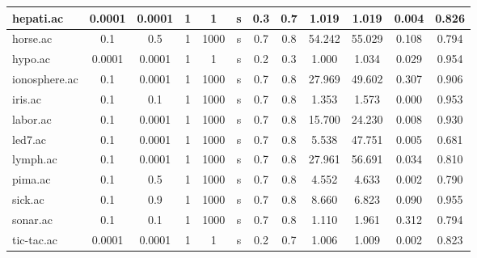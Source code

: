 \begin{table}[htbp]
\begin{tabular}{|l|c|c|c|c|c|c|c||c|c|c|c|}
		\hline
		hepati.ac      & 0.0001   & 0.0001      & 1              & 1                   & s        & 0.3    & 0.7   & 1.019          & 1.019          & 0.004          & 0.826          \\
		\hline
		horse.ac       & 0.1      & 0.5         & 1              & 1000                & s        & 0.7    & 0.8   & 54.242         & 55.029         & 0.108          & 0.794          \\
		\hline
		hypo.ac        & 0.0001   & 0.0001      & 1              & 1                   & s        & 0.2    & 0.3   & 1.000          & 1.034          & 0.029          & 0.954          \\
		\hline
		ionosphere.ac  & 0.1      & 0.0001      & 1              & 1000                & s        & 0.7    & 0.8   & 27.969         & 49.602         & 0.307          & 0.906          \\
		\hline
		iris.ac        & 0.1      & 0.1         & 1              & 1000                & s        & 0.7    & 0.8   & 1.353          & 1.573          & 0.000          & 0.953          \\
		\hline
		labor.ac       & 0.1      & 0.0001      & 1              & 1000                & s        & 0.7    & 0.8   & 15.700         & 24.230         & 0.008          & 0.930          \\
		\hline
		led7.ac        & 0.1      & 0.0001      & 1              & 1000                & s        & 0.7    & 0.8   & 5.538          & 47.751         & 0.005          & 0.681          \\
		\hline
		lymph.ac       & 0.1      & 0.0001      & 1              & 1000                & s        & 0.7    & 0.8   & 27.961         & 56.691         & 0.034          & 0.810          \\
		\hline
		pima.ac        & 0.1      & 0.5         & 1              & 1000                & s        & 0.7    & 0.8   & 4.552          & 4.633          & 0.002          & 0.790          \\
		\hline
		sick.ac        & 0.1      & 0.9         & 1              & 1000                & s        & 0.7    & 0.8   & 8.660          & 6.823          & 0.090          & 0.955          \\
		\hline
		sonar.ac       & 0.1      & 0.1         & 1              & 1000                & s        & 0.7    & 0.8   & 1.110          & 1.961          & 0.312          & 0.794          \\
		\hline
		tic-tac.ac     & 0.0001   & 0.0001      & 1              & 1                   & s        & 0.2    & 0.7   & 1.006          & 1.009          & 0.002          & 0.823          \\

\end{tabular}
\end{table}
